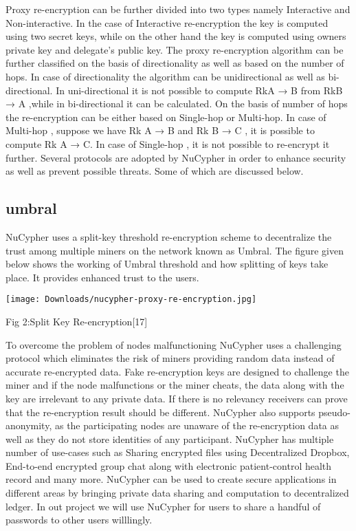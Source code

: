 \documentclass[12pt]{article}
\begin{document}
 Proxy re-encryption can be further divided into two types namely Interactive and Non-interactive. In the case of Interactive re-encryption the key is computed using two secret keys, while on the other hand the key is computed using owners private key and delegate’s public key. The proxy re-encryption algorithm can be further classified on the basis of directionality as well as based on the number of hops. In case of directionality the algorithm can be unidirectional as well as bi-directional. In uni-directional it is not possible to compute RkA → B  from RkB → A ,while in bi-directional it can be calculated. On the basis of number of hops the re-encryption can be either based on Single-hop or Multi-hop. In case of Multi-hop , suppose we have Rk A → B  and Rk B → C , it is possible to compute Rk A → C. In case of Single-hop  , it is not possible to re-encrypt it further. Several protocols are adopted by NuCypher in order to enhance security as well as prevent possible threats. Some of which are discussed below.
 
 \subsection{umbral}
  NuCypher uses a split-key threshold re-encryption scheme to decentralize the trust among multiple miners on the network known as Umbral. The figure given below shows the working of Umbral threshold and how splitting of keys take place. It provides enhanced trust to the users.
  
 \texttt{[image: Downloads/nucypher-proxy-re-encryption.jpg]}
 
\caption{Fig 2:Split Key Re-encryption[17]}
\bigskip
 
 To overcome the problem of nodes malfunctioning NuCypher uses a challenging protocol which eliminates the risk of miners providing random data instead of accurate re-encrypted data. Fake re-encryption keys are designed to challenge the miner and if the node malfunctions or the miner cheats, the data along with the key are irrelevant to any private data. If there is no relevancy receivers can prove that the re-encryption result should be different. NuCypher also supports pseudo-anonymity, as the participating nodes are unaware of the re-encryption data as well as they do not store identities of any participant. NuCypher has multiple number of use-cases such as Sharing encrypted files using Decentralized Dropbox, End-to-end encrypted group chat along with electronic patient-control health record and many more. NuCypher can be used to create secure applications in different areas by bringing private data sharing and computation to decentralized ledger. In out project we will use NuCypher for users to share a handful of passwords to other users willlingly.
\end{document}
